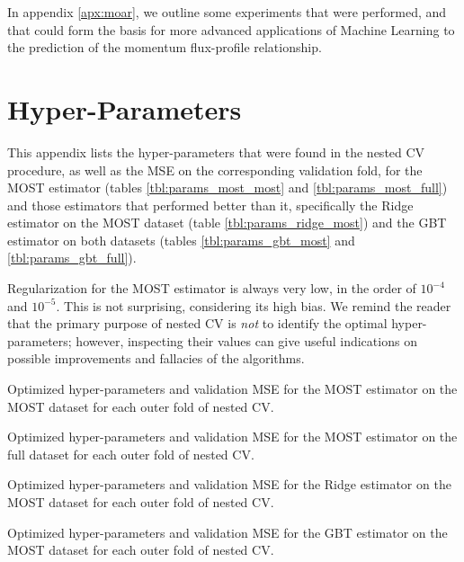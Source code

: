 \documentclass[a4paper,11pt]{kth-mag}
\begin{document}
In appendix \ref{apx:moar}, we outline some experiments that were performed, and that could form the basis for more advanced applications of Machine Learning to the prediction of the momentum flux-profile relationship.

\appendix
\addappheadtotoc

\chapter{Hyper-Parameters}
\label{apx:hyps}

This appendix lists the hyper-parameters that were found in the nested CV procedure, as well as the MSE on the corresponding validation fold, for the MOST estimator (tables \ref{tbl:params_most_most} and \ref{tbl:params_most_full}) and those estimators that performed better than it, specifically the Ridge estimator on the MOST dataset (table \ref{tbl:params_ridge_most}) and the GBT estimator on both datasets (tables \ref{tbl:params_gbt_most} and \ref{tbl:params_gbt_full}).

Regularization for the MOST estimator is always very low, in the order of $10^{-4}$ and $10^{-5}$. This is not surprising, considering its high bias. We remind the reader that the primary purpose of nested CV is \emph{not} to identify the optimal hyper-parameters; however, inspecting their values can give useful indications on possible improvements and fallacies of the algorithms.

\begin{table}
\caption{Optimized hyper-parameters and validation MSE for the MOST estimator on the MOST dataset for each outer fold of nested CV.}
\label{tbl:params_most_most}

\end{table}

\begin{table}
\caption{Optimized hyper-parameters and validation MSE for the MOST estimator on the full dataset for each outer fold of nested CV.}
\label{tbl:params_most_full}

\end{table}


\begin{table}
\caption{Optimized hyper-parameters and validation MSE for the Ridge estimator on the MOST dataset for each outer fold of nested CV.}
\label{tbl:params_ridge_most}

\end{table}


\begin{table}
\caption{Optimized hyper-parameters and validation MSE for the GBT estimator on the MOST dataset for each outer fold of nested CV.}
\label{tbl:params_gbt_most}

\end{table}
\end{document}
